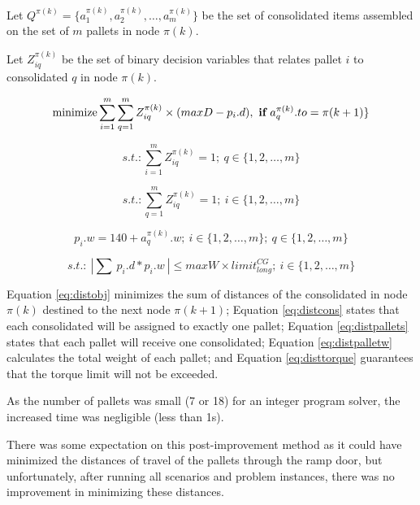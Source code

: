 \documentclass[preprint,authoryear]{elsarticle}
\begin{document}
Let $Q^{\pi(k)}  = \{ a^{\pi(k)}_1, a^{\pi(k)}_2, \ldots, a^{\pi(k)}_m \}$ be the set of consolidated items assembled on the set of $m$ pallets in node $\pi(k)$.

Let $Z^{\pi(k)}_{iq}$ be the set of binary decision variables that relates pallet $i$ to consolidated $q$ in node $\pi(k)$.

\begin{equation} \label{eq:distobj}
	\mbox{minimize} \sum_{i=1}^{m} \sum_{q=1}^{m} Z^{\pi(k)}_{iq} \times ( maxD - p_i.d) ,\ \mbox{{\bf if}}\ a^{\pi(k)}_q.to = \pi(k+1) \}
\end{equation}

\begin{equation} \label{eq:distcons}
	s.t.: \sum_{i=1}^{m} Z^{\pi(k)}_{iq} = 1;\ q \in \{1,2,\ldots,m\}
\end{equation}

\begin{equation} \label{eq:distpallets}
	s.t.: \sum_{q=1}^{m} Z^{\pi(k)}_{iq}=1;\ i \in \{1,2,\ldots,m\}
\end{equation}

\begin{equation} \label{eq:distpalletw}
	p_i.w = 140 + a^{\pi(k)}_q.w ;\ i \in \{1,2,\ldots,m\};\ q \in \{1,2,\ldots,m\}
\end{equation}

\begin{equation} \label{eq:disttorque}
	s.t.:\ | \sum\ p_i.d * p_i.w\ | \leq maxW \times limit^{CG}_{long} ;\ i \in \{1,2,\ldots,m\}
\end{equation}

Equation \ref{eq:distobj} minimizes the sum of distances of the consolidated in node $\pi(k)$ destined to the next node $\pi(k+1)$; Equation \ref{eq:distcons} states that each consolidated will be assigned to exactly one pallet; Equation \ref{eq:distpallets} states that each pallet will receive one consolidated; Equation \ref{eq:distpalletw} calculates the total weight of each pallet; and Equation \ref{eq:disttorque} guarantees that the torque limit will not be exceeded. 

As the number of pallets was small (7 or 18) for an integer program solver, the increased time was negligible (less than 1s).

There was some expectation on this post-improvement method as it could have minimized the distances of travel of the pallets through the ramp door, but unfortunately, after running all scenarios and problem instances, there was no improvement in minimizing these distances.
\end{document}
